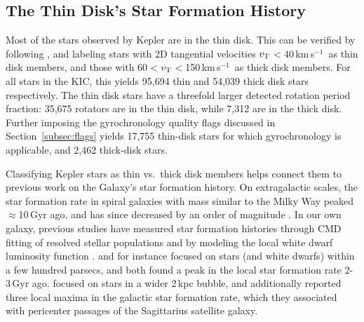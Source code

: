 \documentclass[11pt,twocolumn,tighten,linenumbers]{aastex63}
\newcommand{\kms}{{km\,s$^{-1}$}}
\begin{document}
\subsection{The Thin Disk's Star Formation History}

Most of the stars observed by Kepler are in the thin disk.  This can
be verified by following \citet{Gaia_2018}, and labeling stars with 2D
tangential velocities $v_{\rm T}$$<$40\,\kms\ as thin disk members,
and those with 60$<$$v_{\rm T}$$<$150\,\kms\ as thick disk members.
For all stars in the KIC, this yields 95{,}694 thin and 54{,}039 thick
disk stars respectively.  The thin disk stars have a threefold larger
detected rotation period fraction: 35{,}675 rotators are in the thin
disk, while 7{,}312 are in the thick disk.  Further imposing the
gyrochronology quality flags discussed in Section~\ref{subsec:flags}
yields 17{,}755 thin-disk stars for which gyrochronology is
applicable, and 2{,}462 thick-disk stars.

Classifying Kepler stars as thin vs.\ thick disk members helps connect
them to previous work on the Galaxy's star formation history.  On
extragalactic scales, the star formation rate in spiral galaxies with
mass similar to the Milky Way peaked $\approx$10\,Gyr ago, and has
since decreased by an order of magnitude
\citep[e.g.][]{2004Natur.428..625H,2006ApJ...651..142H}.  In our own
galaxy, previous studies have measured star formation histories
through CMD fitting of resolved stellar populations
\citep[][]{2019A&A...624L...1M,2020NatAs...4..965R,2021MNRAS.501..302A,2022Natur.603..599X}
and by modeling the local white dwarf luminosity function
\citep[e.g.][]{2019ApJ...878L..11I}.  \citet{2019A&A...624L...1M} and
\citet{2019ApJ...878L..11I} for instance focused on stars (and white
dwarfs) within a few hundred parsecs, and both found a peak in the
local star formation rate 2-3\,Gyr ago.  \citet{2020NatAs...4..965R}
focused on stars in a wider 2\,kpc bubble, and additionally reported
three local maxima in the galactic star formation rate, which they
associated with pericenter passages of the Sagittarius satellite
galaxy.
\end{document}
